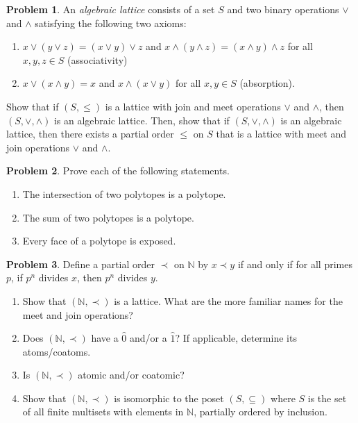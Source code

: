 \documentclass[letterpaper,11pt]{amsart}
\theoremstyle{plain}
\theoremstyle{definition}
\newtheorem{pr}{Problem}
\theoremstyle{remark}
\begin{document}
\begin{pr}\label{pr: algebraic definition of lattice}
    An \emph{algebraic lattice} consists of a set $S$ and two binary operations $\vee$ and $\wedge$ satisfying the following two axioms:
    \begin{enumerate}
        \item $x \vee (y \vee z) = (x \vee y) \vee z$ and $x \wedge (y \wedge z) = (x \wedge y) \wedge z$ for all $x,y,z \in S$ (associativity)
        \item $x \vee (x \wedge y) = x$ and $x \wedge (x \vee y)$ for all $x, y \in S$ (absorption).
    \end{enumerate}
    Show that if $(S,\le)$ is a lattice with join and meet operations $\vee$ and $\wedge$, then $(S,\vee,\wedge)$ is an algebraic lattice.
    Then, show that if $(S,\vee,\wedge)$ is an algebraic lattice,
    then there exists a partial order $\le$ on $S$ that is a lattice with meet and join operations $\vee$ and $\wedge$.
\end{pr}

\bigskip


\bigskip

\begin{pr}
    Prove each of the following statements. 
    \begin{enumerate}
        \item The intersection of two polytopes is a polytope.
        \item The sum of two polytopes is a polytope.
        \item Every face of a polytope is exposed.
    \end{enumerate}
\end{pr}


\begin{pr}\label{pr: divisor lattice}
    Define a partial order $\prec$ on $\mathbb{N}$ by $x \prec y$ if and only if for all primes $p$, if $p^n$ divides $x$, then $p^n$ divides $y$.
    \begin{enumerate}
        \item Show that $(\mathbb{N},\prec)$ is a lattice. What are the more familiar names for the meet and join operations?
        \item Does $(\mathbb{N},\prec)$ have a $\hat{0}$ and/or a $\hat{1}$? If applicable, determine its atoms/coatoms.
        \item Is $(\mathbb{N},\prec)$ atomic and/or coatomic?
        \item Show that $(\mathbb{N},\prec)$ is isomorphic to the poset $(S,\subseteq)$ where $S$ is the set of all finite multisets with elements in $\mathbb{N}$, partially ordered by inclusion.
    \end{enumerate}
\end{pr}
\end{document}

